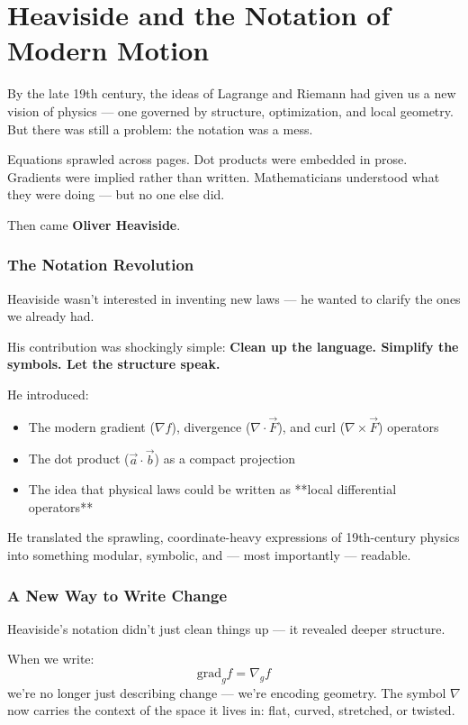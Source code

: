 \section{Heaviside and the Notation of Modern Motion}

By the late 19th century, the ideas of Lagrange and Riemann had given us a new vision of physics — one governed by structure, optimization, and local geometry.  
But there was still a problem: the notation was a mess.

Equations sprawled across pages. Dot products were embedded in prose. Gradients were implied rather than written. Mathematicians understood what they were doing — but no one else did.

Then came \textbf{Oliver Heaviside}.

\subsubsection*{The Notation Revolution}

Heaviside wasn’t interested in inventing new laws — he wanted to clarify the ones we already had.

His contribution was shockingly simple:  
\textbf{Clean up the language. Simplify the symbols. Let the structure speak.}

He introduced:
\begin{itemize}
    \item The modern gradient (\( \nabla f \)), divergence (\( \nabla \cdot \vec{F} \)), and curl (\( \nabla \times \vec{F} \)) operators
    \item The dot product (\( \vec{a} \cdot \vec{b} \)) as a compact projection
    \item The idea that physical laws could be written as **local differential operators**
\end{itemize}

He translated the sprawling, coordinate-heavy expressions of 19th-century physics into something modular, symbolic, and — most importantly — readable.

\subsubsection*{A New Way to Write Change}

Heaviside’s notation didn’t just clean things up — it revealed deeper structure.

When we write:
\[
\text{grad}_g f = \nabla_g f
\]
we’re no longer just describing change — we’re encoding geometry. The symbol \( \nabla \) now carries the context of the space it lives in: flat, curved, stretched, or twisted.

